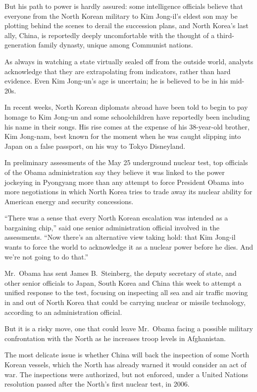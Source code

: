 \documentclass[12pt,a4paper,onecolumn]{article}
\begin{document}
But his path to power is hardly assured: some intelligence officials believe that everyone from the
North Korean military to Kim Jong-il's eldest son may be plotting behind the scenes to derail the
succession plans, and North Korea's last ally, China, is reportedly deeply uncomfortable with the
thought of a third-generation family dynasty, unique among Communist nations.

As always in watching a state virtually sealed off from the outside world, analysts acknowledge that
they are extrapolating from indicators, rather than hard evidence. Even Kim Jong-un's age is
uncertain; he is believed to be in his mid-20s.

In recent weeks, North Korean diplomats abroad have been told to begin to pay homage to Kim Jong-un
and some schoolchildren have reportedly been including his name in their songs. His rise comes at
the expense of his 38-year-old brother, Kim Jong-nam, best known for the moment when he was caught
slipping into Japan on a false passport, on his way to Tokyo Disneyland.

In preliminary assessments of the May 25 underground nuclear test, top officials of the Obama
administration say they believe it was linked to the power jockeying in Pyongyang more than any
attempt to force President Obama into more negotiations in which North Korea tries to trade away its
nuclear ability for American energy and security concessions.

``There was a sense that every North Korean escalation was intended as a bargaining chip,'' said one
senior administration official involved in the assessments. ``Now there's an alternative view taking
hold: that Kim Jong-il wants to force the world to acknowledge it as a nuclear power before he dies.
And we're not going to do that.''

Mr.~Obama has sent James B.~Steinberg, the deputy secretary of state, and other senior officials to
Japan, South Korea and China this week to attempt a unified response to the test, focusing on
inspecting all sea and air traffic moving in and out of North Korea that could be carrying nuclear
or missile technology, according to an administration official.

But it is a risky move, one that could leave Mr.~Obama facing a possible military confrontation with
the North as he increases troop levels in Afghanistan.

The most delicate issue is whether China will back the inspection of some North Korean vessels,
which the North has already warned it would consider an act of war. The inspections were authorized,
but not enforced, under a United Nations resolution passed after the North's first nuclear test, in
2006.
\end{document}
